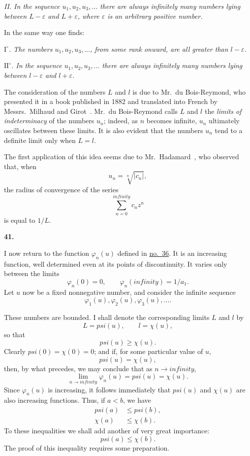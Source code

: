 \documentclass[
  paper=b5,
  fontsize=13pt,
  twoside,
  headings=normal,
  bookmarkpackage=false
]{scrartcl}
\theoremstyle{stieltjesplain}
\theoremstyle{stieltjesdefinition}
\def\frac#1#2{#1/#2}%
\def\psi{psi}%
\def\infty{infinity}%
\newcommand{\origsection}[1]{%
  \par\addvspace{0.85\baselineskip}%
  \phantomsection\label{sec:#1}%
  \addcontentsline{toc}{subsection}{\texorpdfstring{\S~#1}{Section #1}}%
  \noindent\textbf{#1.}\quad\ignorespaces
}
\begin{document}
\emph{II. In the sequence $u_1,u_2,u_3,\ldots$ there are always infinitely many numbers lying between $L-\varepsilon$ and $L+\varepsilon$, where $\varepsilon$ is an arbitrary positive number.}

In the same way one finds:

\emph{$\mathrm{I}^{\circ}$. The numbers $u_1,u_2,u_3,\ldots$, from some rank onward, are all greater than $l-\varepsilon$.}

\emph{$\mathrm{II}^{\circ}$. In the sequence $u_1,u_2,u_3,\ldots$ there are always infinitely many numbers lying between $l-\varepsilon$ and $l+\varepsilon$.}

The consideration of the numbers $L$ and $l$ is due to Mr.~du Bois-Reymond, who presented it in a book published in 1882 and translated into French by Messrs.~Milhaud and Girot~\cite{DuBoisReymond1882}. Mr.~du Bois-Reymond calls $L$ and $l$ the \emph{limits of indeterminacy} of the numbers $u_n$; indeed, as $n$ becomes infinite, $u_n$ ultimately oscillates between these limits. It is also evident that the numbers $u_n$ tend to a definite limit only when $L=l$.

The first application of this idea seems due to
Mr.~Hadamard~\cite{Hadamard1892}, who observed that, when
\[
 u_n=\sqrt[n]{|c_n|},
\]
the radius of convergence of the series
\[
 \sum_{n=0}^{\infty}c_nz^n
\]
is equal to $1/L$.

\origsection{41}
I now return to the function $\varphi_n(u)$ defined in \hyperref[sec:36]{no.~36}. It is an increasing function, well determined even at its points of discontinuity. It varies only between the limits
\[
 \varphi_n(0)=0,\qquad \varphi_n(\infty)=\frac1{a_1}.
\]
Let $u$ now be a fixed nonnegative number, and consider the infinite sequence
\[
 \varphi_1(u),\varphi_2(u),\varphi_3(u),\ldots.
\]

These numbers are bounded. I shall denote the corresponding limits $L$ and $l$ by
\[
 L=\psi(u),\qquad l=\chi(u),
\]
so that
\[
 \psi(u)\geq\chi(u).
\]
Clearly $\psi(0)=\chi(0)=0$; and if, for some particular value of $u$,
\[
 \psi(u)=\chi(u),
\]
then, by what precedes, we may conclude that as $n\to\infty$,
\[
 \lim_{n\to\infty}\varphi_n(u)=\psi(u)=\chi(u).
\]
Since $\varphi_n(u)$ is increasing, it follows immediately that $\psi(u)$ and $\chi(u)$ are also increasing functions. Thus, if $a<b$, we have
\begin{align}
 \psi(a)&\leq\psi(b), \tag{1}\label{eq:s41-1}\\
 \chi(a)&\leq\chi(b). \tag{2}\label{eq:s41-2}
\end{align}
To these inequalities we shall add another of very great importance:
\begin{equation}
 \psi(a)\leq\chi(b).
 \tag{3}\label{eq:s41-3}
\end{equation}
The proof of this inequality requires some preparation.
\end{document}
